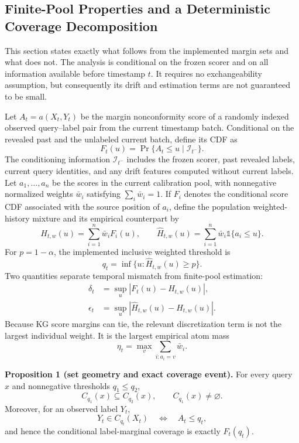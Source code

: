 \subsection{Finite-Pool Properties and a Deterministic Coverage Decomposition}
\label{sec:theory-scope}

This section states exactly what follows from the implemented margin sets and
what does not.  The analysis is conditional on the frozen scorer and on all
information available before timestamp \(t\).  It requires no exchangeability
assumption, but consequently its drift and estimation terms are not guaranteed
to be small.

Let \(A_t=a(X_t,Y_t)\) be the margin nonconformity score of a randomly indexed
observed query--label pair from the current timestamp batch.  Conditional on
the revealed past and the unlabeled current batch, define its CDF as
\[
  F_t(u)=\Pr\{A_t\leq u\mid\mathcal{I}_{t^-}\}.
\]
The conditioning information \(\mathcal{I}_{t^-}\) includes the frozen scorer,
past revealed labels, current query identities, and any drift features computed
without current labels.  Let \(a_1,\ldots,a_n\) be the scores in the current
calibration pool, with nonnegative normalized weights
\(\bar w_i\) satisfying \(\sum_i\bar w_i=1\).  If \(F_i\) denotes the
conditional score CDF associated with the source position of \(a_i\), define
the population weighted-history mixture and its empirical counterpart by
\[
  H_{t,w}(u)=\sum_{i=1}^{n}\bar w_iF_i(u),
  \qquad
  \widehat H_{t,w}(u)=\sum_{i=1}^{n}\bar w_i
  \mathbb{1}\{a_i\leq u\}.
\]
For \(p=1-\alpha\), the implemented inclusive weighted threshold is
\[
  q_t=\inf\{u:\widehat H_{t,w}(u)\geq p\}.
\]
Two quantities separate temporal mismatch from finite-pool estimation:
\[
\begin{aligned}
  \delta_t&=\sup_u|F_t(u)-H_{t,w}(u)|,\\
  \epsilon_t&=\sup_u|\widehat H_{t,w}(u)-H_{t,w}(u)|.
\end{aligned}
\]
Because KG score margins can tie, the relevant discretization term is not the
largest individual weight.  It is the largest empirical atom mass
\[
  \eta_t=\max_v\sum_{i:a_i=v}\bar w_i.
\]

\noindent\textbf{Proposition 1 (set geometry and exact coverage event).}\quad
For every query \(x\) and nonnegative thresholds \(q_1\leq q_2\),
\[
  C_{q_1}(x)\subseteq C_{q_2}(x),
  \qquad C_{q_1}(x)\neq\varnothing.
\]
Moreover, for an observed label \(Y_t\),
\[
  Y_t\in C_{q_t}(X_t)
  \quad\Longleftrightarrow\quad A_t\leq q_t,
\]
and hence the conditional label-marginal coverage is exactly \(F_t(q_t)\).

